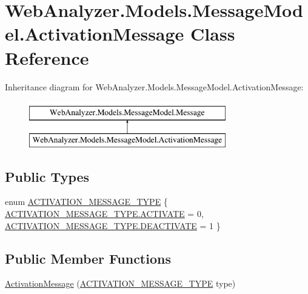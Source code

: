 \hypertarget{class_web_analyzer_1_1_models_1_1_message_model_1_1_activation_message}{}\section{Web\+Analyzer.\+Models.\+Message\+Model.\+Activation\+Message Class Reference}
\label{class_web_analyzer_1_1_models_1_1_message_model_1_1_activation_message}
Inheritance diagram for Web\+Analyzer.\+Models.\+Message\+Model.\+Activation\+Message\+:\begin{figure}[H]
\begin{center}
\leavevmode
\includegraphics[height=2.000000cm]{class_web_analyzer_1_1_models_1_1_message_model_1_1_activation_message}
\end{center}
\end{figure}
\subsection*{Public Types}
\begin{DoxyCompactItemize}
\item 
enum \hyperlink{class_web_analyzer_1_1_models_1_1_message_model_1_1_activation_message_ad3b5847039dd26527a842c6f7675b1b2}{A\+C\+T\+I\+V\+A\+T\+I\+O\+N\+\_\+\+M\+E\+S\+S\+A\+G\+E\+\_\+\+T\+Y\+P\+E} \{ \hyperlink{class_web_analyzer_1_1_models_1_1_message_model_1_1_activation_message_ad3b5847039dd26527a842c6f7675b1b2aa9409daa2beb494ef861efb51d5cd6bb}{A\+C\+T\+I\+V\+A\+T\+I\+O\+N\+\_\+\+M\+E\+S\+S\+A\+G\+E\+\_\+\+T\+Y\+P\+E.\+A\+C\+T\+I\+V\+A\+T\+E} = 0, 
\hyperlink{class_web_analyzer_1_1_models_1_1_message_model_1_1_activation_message_ad3b5847039dd26527a842c6f7675b1b2a5810e63771fb03117a3e2bcf98d5b9f0}{A\+C\+T\+I\+V\+A\+T\+I\+O\+N\+\_\+\+M\+E\+S\+S\+A\+G\+E\+\_\+\+T\+Y\+P\+E.\+D\+E\+A\+C\+T\+I\+V\+A\+T\+E} = 1
 \}
\end{DoxyCompactItemize}
\subsection*{Public Member Functions}
\begin{DoxyCompactItemize}
\item 
\hyperlink{class_web_analyzer_1_1_models_1_1_message_model_1_1_activation_message_a20a171686a029b6466062511e4ca2fda}{Activation\+Message} (\hyperlink{class_web_analyzer_1_1_models_1_1_message_model_1_1_activation_message_ad3b5847039dd26527a842c6f7675b1b2}{A\+C\+T\+I\+V\+A\+T\+I\+O\+N\+\_\+\+M\+E\+S\+S\+A\+G\+E\+\_\+\+T\+Y\+P\+E} type)
\end{DoxyCompactItemize}

